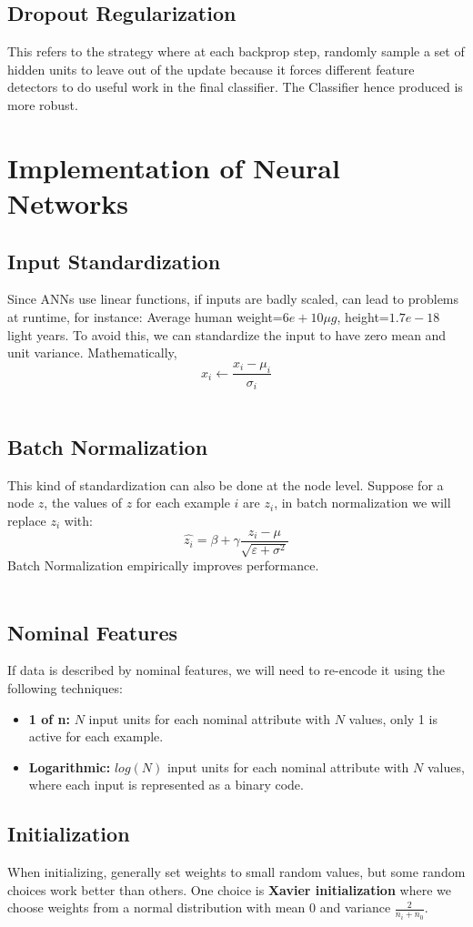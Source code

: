 \documentclass[12pt, a4paper]{book}
\begin{document}
\subsection{Dropout Regularization}
This refers to the strategy where at each backprop step, randomly sample a set of hidden units to leave out of the update because it forces different feature detectors to do useful work in the final classifier. The Classifier hence produced is more robust.

\section{Implementation of Neural Networks}
\subsection{Input Standardization}
Since ANNs use linear functions, if inputs are badly scaled, can lead to problems at runtime, for instance: Average human weight=$6e+10 \mu g$, height=$1.7e-18$ light years. To avoid this, we can standardize the input to have zero mean and unit variance. Mathematically,
$$x_i \gets \frac{x_i - \mu_i}{\sigma_i}$$\\
\subsection{Batch Normalization}
This kind of standardization can also be done at the node level. Suppose for a node $z$, the values of $z$ for each example $i$ are $z_i$, in batch normalization we will replace $z_i$ with:
$$\hat{z_i} = \beta + \gamma\frac{z_i - \mu}{\sqrt{\varepsilon + \sigma^2}}$$
Batch Normalization empirically improves performance.\\\\
\subsection{Nominal Features}
If data is described by nominal features, we will need to re-encode it using the following techniques:
\begin{itemize}
    \item \textbf{1 of n:} $N$ input units for each nominal attribute with $N$ values, only 1 is active for each example.
    \item \textbf{Logarithmic:} $log(N)$ input units for each nominal attribute with $N$ values, where each input is represented as a binary code.\\
\end{itemize}
\subsection{Initialization}
When initializing, generally set weights to small random values, but some random choices work better than others. One choice is \textbf{Xavier initialization} where we choose weights from a normal distribution with mean 0 and variance $\frac{2}{n_i+n_0}$.

\newpage


\end{document}
